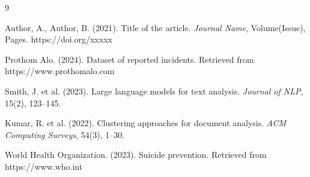 \documentclass[12pt,a4paper]{article}
\begin{document}
\begin{thebibliography}{9}

Author, A., Author, B. (2021). Title of the article. \textit{Journal Name}, Volume(Issue), Pages. https://doi.org/xxxxx

Prothom Alo. (2024). Dataset of reported incidents. Retrieved from https://www.prothomalo.com

Smith, J. et al. (2023). Large language models for text analysis. \textit{Journal of NLP}, 15(2), 123--145.

Kumar, R. et al. (2022). Clustering approaches for document analysis. \textit{ACM Computing Surveys}, 54(3), 1--30.

World Health Organization. (2023). Suicide prevention. Retrieved from https://www.who.int

\end{thebibliography}
\end{document}
